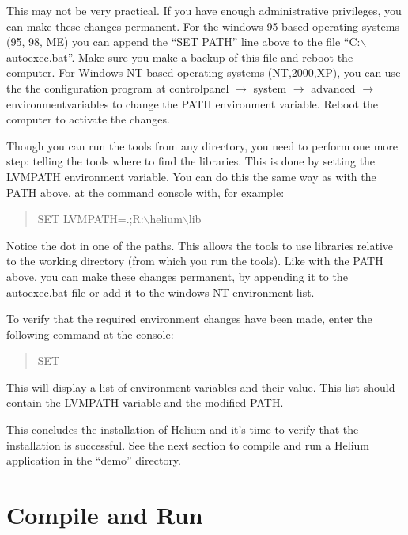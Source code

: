 \documentclass[pdftex,11pt,a4paper,notitlepage]{article}
\begin{document}
        This may not be very practical. If you have enough administrative
        privileges, you can make these changes permanent. For the windows 95
        based operating systems (95, 98, ME) you can append the ``SET PATH'' line
        above to the file ``C:$\backslash$autoexec.bat''. Make sure you make a
        backup of this file and reboot the computer. For Windows NT based
        operating systems (NT,2000,XP), you can use the the configuration program at
        controlpanel $\rightarrow$ system $\rightarrow$ advanced $\rightarrow$
        environmentvariables to change the PATH environment variable. Reboot the
        computer to activate the changes.
        
        Though you can run the tools from any directory, you need to perform one
        more step: telling the tools where to find the libraries. This is done by
        setting the LVMPATH environment variable. You can do this the same way as
        with the PATH above, at the command console with, for example:
        \begin{quote}
        SET LVMPATH=.;R:$\backslash$helium$\backslash$lib
        \end{quote}
        Notice the dot in one of the paths. This allows the tools to use libraries
        relative to the working directory (from which you run the tools). Like with
        the PATH above, you can make these changes permanent, by appending it to the
        autoexec.bat file or add it to the windows NT environment list.
        
        To verify that the required environment changes have been made, enter the
        following command at the console:
        \begin{quote}
        SET
        \end{quote}
        This will display a list of environment variables and their value. This list
        should contain the LVMPATH variable and the modified PATH.
        
        This concludes the installation of Helium and it's time to verify that the
        installation is successful. See the next section to compile and run a
        Helium application in the ``demo'' directory.


    \section{Compile and Run}
    
\end{document}
